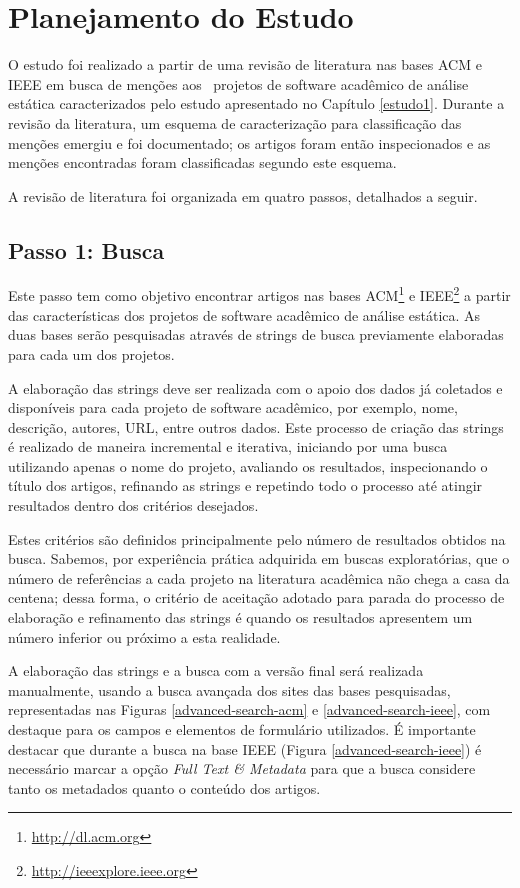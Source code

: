 
\section{Planejamento do Estudo} \label{estudo2:planejamento} %

O estudo foi realizado a partir de uma revisão de literatura nas bases ACM e
IEEE em busca de menções aos \SoftwareCount \ projetos de software acadêmico de
análise estática caracterizados pelo estudo apresentado no Capítulo \ref{estudo1}. 
Durante a revisão da literatura, 
um esquema de caracterização para classificação das menções emergiu e foi documentado;
os artigos foram então inspecionados e as menções encontradas foram classificadas segundo
este esquema.

A revisão de literatura foi organizada em quatro passos, detalhados a seguir.

\subsection{Passo 1: Busca}

Este passo tem como objetivo encontrar artigos nas bases
ACM\footnote{\url{http://dl.acm.org}} e
IEEE\footnote{\url{http://ieeexplore.ieee.org}} a partir das características
dos projetos de software acadêmico de análise estática.
As duas bases serão pesquisadas através de strings de busca previamente
elaboradas para cada um dos projetos.

A elaboração das strings deve ser realizada com o apoio dos dados já coletados
e disponíveis para cada projeto de software acadêmico, por exemplo, nome,
descrição, autores, URL, entre outros dados. Este processo de criação das
strings é realizado de maneira incremental e iterativa, iniciando por uma busca
utilizando apenas o nome do projeto, avaliando os resultados, inspecionando o
título dos artigos, refinando as strings e repetindo todo o processo até
atingir resultados dentro dos critérios desejados.

Estes critérios são definidos principalmente pelo
número de resultados obtidos na busca.
Sabemos, por experiência prática adquirida em buscas exploratórias, 
que o número de referências a cada projeto na
literatura acadêmica não chega a casa da centena; dessa forma, o critério de
aceitação adotado para parada do processo de elaboração e refinamento das strings é
quando os resultados apresentem um número inferior ou próximo a esta realidade.

A elaboração das strings e a busca com a versão final será
realizada manualmente, usando a busca avançada dos sites das bases pesquisadas,
representadas nas Figuras \ref{advanced-search-acm} e
\ref{advanced-search-ieee}, com destaque para os campos e elementos de formulário
utilizados. É importante destacar que durante a busca na
base IEEE (Figura \ref{advanced-search-ieee}) é necessário marcar a opção {\it Full Text \& Metadata} para que a
busca considere tanto os metadados quanto o conteúdo dos artigos.

